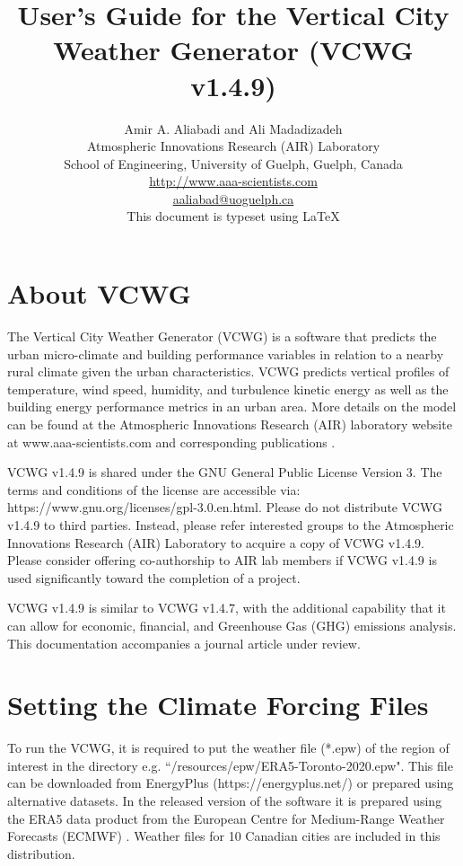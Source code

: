 \documentclass[12pt]{article}
\title{User's Guide for the Vertical City Weather Generator
	(VCWG v1.4.9)}
\author{Amir A. Aliabadi and Ali Madadizadeh\\
	Atmospheric Innovations Research (AIR) Laboratory \\
School of Engineering, University of Guelph, Guelph, Canada \\
\small \url{http://www.aaa-scientists.com} \\
\small \href{mailto:aaliabad@uoguelph.ca}{aaliabad@uoguelph.ca} \\
\small This document is typeset using \LaTeX \\
}
\begin{document}
\maketitle

\section{About VCWG}

The Vertical City Weather Generator (VCWG) is a software that predicts the urban micro-climate and building performance variables in relation to a nearby rural climate given the urban characteristics. VCWG predicts vertical profiles of temperature, wind speed, humidity, and turbulence kinetic energy as well as the building energy performance metrics in an urban area. More details on the model can be found at the Atmospheric Innovations Research (AIR) laboratory website at www.aaa-scientists.com and corresponding publications \cite{Moradi2021a, Moradi2021b, Aliabadi2021b, Moradi2022, Aliabadi2023c, Safdari2024}.

VCWG v1.4.9 is shared under the GNU General Public License Version 3. The terms and conditions of the license are accessible via: https://www.gnu.org/licenses/gpl-3.0.en.html. Please do not distribute VCWG v1.4.9 to third parties. Instead, please refer interested groups to the Atmospheric Innovations Research (AIR) Laboratory to acquire a copy of VCWG v1.4.9. Please consider offering co-authorship to AIR lab members if VCWG v1.4.9 is used significantly toward the completion of a project.

VCWG v1.4.9 is similar to VCWG v1.4.7, with the additional capability that it can allow for economic, financial, and Greenhouse Gas (GHG) emissions analysis. This documentation accompanies a journal article under review. 

\section{Setting the Climate Forcing Files}

To run the VCWG, it is required to put the weather file (*.epw) of the region of interest in the directory e.g. ``/resources/epw/ERA5-Toronto-2020.epw". This file can be downloaded from EnergyPlus (https://energyplus.net/) or prepared using alternative datasets. In the released version of the software it is prepared using the ERA5 data product from the European Centre for Medium-Range Weather Forecasts (ECMWF) \cite{Aliabadi2023a}. Weather files for 10 Canadian cities are included in this distribution.
\end{document}

